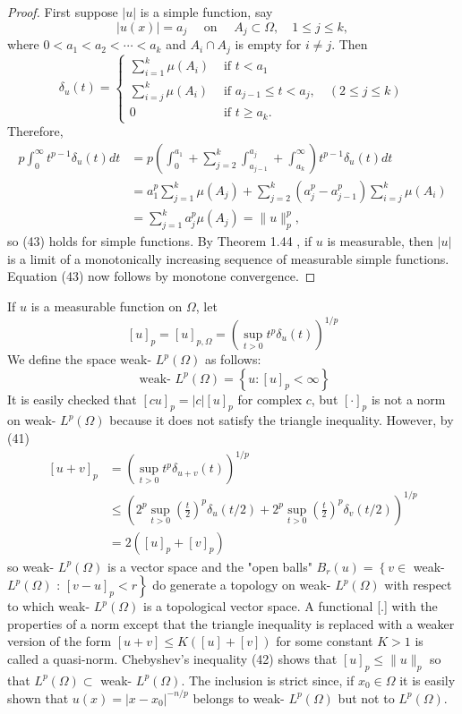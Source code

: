 \begin{proof}
  First suppose $|u|$ is a simple function, say
  \[
  |u(x)|=a_j \quad \text { on } \quad A_j \subset \Omega, \quad 1 \leq j \leq k,
  \]
  where $0<a_1<a_2<\cdots<a_k$ and $A_i \cap A_j$ is empty for $i \neq j$. Then
  \[
  \delta_u(t)= \begin{cases}\sum_{i=1}^k \mu\left(A_i\right) & \text { if } t<a_1 \\ \sum_{i=j}^k \mu\left(A_i\right) & \text { if } a_{j-1} \leq t<a_j, \quad(2 \leq j \leq k) \\ 0 & \text { if } t \geq a_k .\end{cases}
  \]
  Therefore,
  \[
  \begin{aligned}
  p \int_0^{\infty} t^{p-1} \delta_u(t) d t & =p\left(\int_0^{a_1}+\sum_{j=2}^k \int_{a_{j-1}}^{a_j}+\int_{a_k}^{\infty}\right) t^{p-1} \delta_u(t) d t \\
  & =a_1^p \sum_{j=1}^k \mu\left(A_j\right)+\sum_{j=2}^k\left(a_j^p-a_{j-1}^p\right) \sum_{i=j}^k \mu\left(A_i\right) \\
  & =\sum_{j=1}^k a_j^p \mu\left(A_j\right)=\|u\|_p^p,
  \end{aligned}
  \]
  so (43) holds for simple functions. By Theorem 1.44 , if $u$ is measurable, then $|u|$ is a limit of a monotonically increasing sequence of measurable simple functions. Equation (43) now follows by monotone convergence.
\end{proof}


\begin{para}
  If $u$ is a measurable function on $\Omega$, let
  \[
  [u]_p=[u]_{p, \Omega}=\left(\sup _{t>0} t^p \delta_u(t)\right)^{1 / p}
  \]
  We define the space weak- $L^p(\Omega)$ as follows:
  \[
  \text { weak- } L^p(\Omega)=\left\{u:[u]_p<\infty\right\}
  \]
  It is easily checked that $[c u]_p=|c|[u]_p$ for complex $c$, but $[\cdot]_p$ is not a norm on weak- $L^p(\Omega)$ because it does not satisfy the triangle inequality. However, by (41)
  \[
  \begin{aligned}
  {[u+v]_p } & =\left(\sup _{t>0} t^p \delta_{u+v}(t)\right)^{1 / p} \\
  & \leq\left(2^p \sup _{t>0}\left(\frac{t}{2}\right)^p \delta_u(t / 2)+2^p \sup _{t>0}\left(\frac{t}{2}\right)^p \delta_v(t / 2)\right)^{1 / p} \\
  & =2\left([u]_p+[v]_p\right)
  \end{aligned}
  \]
  so weak- $L^p(\Omega)$ is a vector space and the "open balls" $B_r(u)=\left\{v \in\right.$ weak- $L^p(\Omega)$ : $\left.[v-u]_p<r\right\}$ do generate a topology on weak- $L^p(\Omega)$ with respect to which weak- $L^p(\Omega)$ is a topological vector space. A functional [.] with the properties of a norm except that the triangle inequality is replaced with a weaker version of the form $[u+v] \leq K([u]+[v])$ for some constant $K>1$ is called a quasi-norm.
  Chebyshev's inequality (42) shows that $[u]_p \leq\|u\|_p$ so that $L^p(\Omega) \subset$ weak- $L^p(\Omega)$. The inclusion is strict since, if $x_0 \in \Omega$ it is easily shown that $u(x)=\left|x-x_0\right|^{-n / p}$ belongs to weak- $L^p(\Omega)$ but not to $L^p(\Omega)$.
\end{para}


